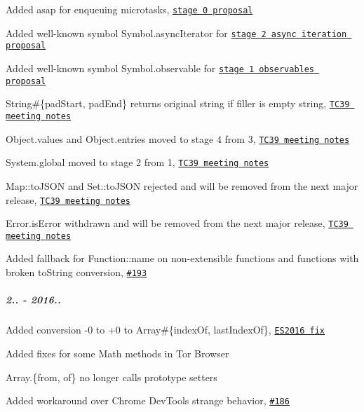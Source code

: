 \begin{DoxyItemize}
\item Added {\ttfamily asap} for enqueuing microtasks, \href{https://github.com/rwaldron/tc39-notes/blob/master/es6/2014-09/sept-25.md#510-globalasap-for-enqueuing-a-microtask}{\tt stage 0 proposal}
\item Added well-\/known symbol {\ttfamily Symbol.\+async\+Iterator} for \href{https://github.com/tc39/proposal-async-iteration}{\tt stage 2 async iteration proposal}
\item Added well-\/known symbol {\ttfamily Symbol.\+observable} for \href{https://github.com/zenparsing/es-observable}{\tt stage 1 observables proposal}
\item {\ttfamily String\#\{pad\+Start, pad\+End\}} returns original string if filler is empty string, \href{https://github.com/rwaldron/tc39-notes/blob/master/es7/2016-03/march-29.md#stringprototypepadstartpadend}{\tt T\+C39 meeting notes}
\item {\ttfamily Object.\+values} and {\ttfamily Object.\+entries} moved to stage 4 from 3, \href{https://github.com/rwaldron/tc39-notes/blob/master/es7/2016-03/march-29.md#objectvalues--objectentries}{\tt T\+C39 meeting notes}
\item {\ttfamily System.\+global} moved to stage 2 from 1, \href{https://github.com/rwaldron/tc39-notes/blob/master/es7/2016-03/march-29.md#systemglobal}{\tt T\+C39 meeting notes}
\item {\ttfamily Map\+::to\+J\+S\+ON} and {\ttfamily Set\+::to\+J\+S\+ON} rejected and will be removed from the next major release, \href{https://github.com/rwaldron/tc39-notes/blob/master/es7/2016-03/march-31.md#mapprototypetojsonsetprototypetojson}{\tt T\+C39 meeting notes}
\item {\ttfamily Error.\+is\+Error} withdrawn and will be removed from the next major release, \href{https://github.com/rwaldron/tc39-notes/blob/master/es7/2016-03/march-29.md#erroriserror}{\tt T\+C39 meeting notes}
\item Added fallback for {\ttfamily Function\+::name} on non-\/extensible functions and functions with broken {\ttfamily to\+String} conversion, \href{https://github.com/zloirock/core-js/issues/193}{\tt \#193}
\end{DoxyItemize}

\subparagraph*{2.. -\/ 2016..}


\begin{DoxyItemize}
\item Added conversion {\ttfamily -\/0} to {\ttfamily +0} to {\ttfamily Array\#\{index\+Of, last\+Index\+Of\}}, \href{https://github.com/tc39/ecma262/pull/316}{\tt E\+S2016 fix}
\item Added fixes for some {\ttfamily Math} methods in Tor Browser
\item {\ttfamily Array.\{from, of\}} no longer calls prototype setters
\item Added workaround over Chrome Dev\+Tools strange behavior, \href{https://github.com/zloirock/core-js/issues/186}{\tt \#186}
\end{DoxyItemize}


